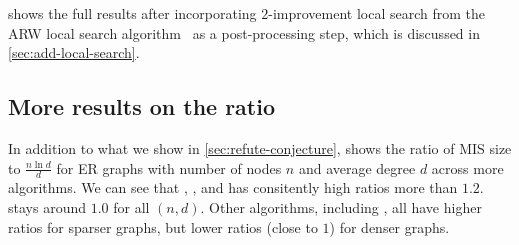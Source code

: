  shows the full results after incorporating $2$-improvement local search from the ARW local search algorithm~\citep{andrade2012fast} as a post-processing step, which is discussed in \cref{sec:add-local-search}.

\subsection{More results on the ratio}\label{sec:more-exp-ratio}
In addition to what we show in \cref{sec:refute-conjecture},  shows the ratio of MIS size to $\frac{n\ln d}{d}$ for ER graphs with number of nodes $n$ and average degree $d$ across more algorithms. We can see that \redumis, \onlinemis, and \isco has consitently high ratios more than $1.2$. \rangreedy stays around $1.0$ for all $(n,d)$. Other algorithms, including \deggreedy, all have higher ratios for sparser graphs, but lower ratios (close to $1$) for denser graphs.

